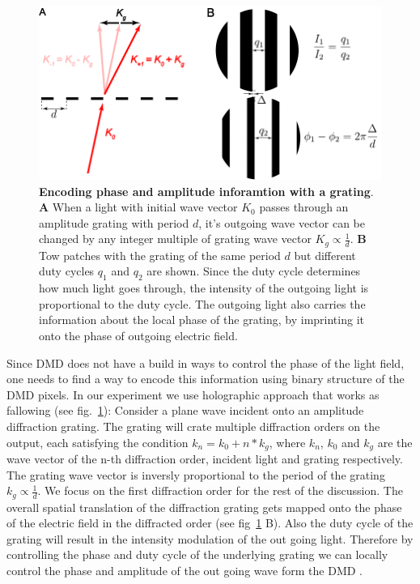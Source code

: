 \begin{figure}[t]
	\centering
	\includegraphics[scale=1]{figures/DMD_grating.pdf}
	\caption{{\bf Encoding phase and amplitude inforamtion with a grating}. {\bf A} When a light with initial wave vector $K_0$ passes through an amplitude grating with period $d$, it's outgoing wave vector can be changed by any integer multiple of grating wave vector $K_g\propto \frac{1}{d}$. {\bf B} Tow patches with the grating of the same period $d$ but different duty cycles $q_1$ and $q_2$ are shown. Since the duty cycle determines how much light goes through, the intensity of the outgoing light is proportional to the duty cycle. The outgoing light also carries the information about the local phase of the grating, by imprinting it onto the phase of outgoing electric field.}
	\label{fig:DMD_grating}
\end{figure}

Since DMD does not have a build in ways to control the phase of the light field, one needs to find a way to encode this information using binary structure of the DMD pixels. In our experiment we use holographic approach that works as fallowing (see fig.~\ref{fig:DMD_grating}): Consider a plane wave incident onto an amplitude diffraction grating. The grating will crate multiple diffraction orders on the output, each satisfying the condition $k_n = k_0 + n*k_g$, where $k_n$, $k_0$ and $k_g$ are the wave vector of the n-th diffraction order, incident light and grating respectively. The grating wave vector is inversly proportional to the period of the grating $k_g \propto \frac{1}{d}$. We focus on the first diffraction order for the rest of the discussion. The overall spatial translation of the diffraction grating gets mapped onto the phase of the electric field in the diffracted order (see fig~\ref{fig:DMD_grating} B). Also the duty cycle of the grating will result in the intensity modulation of the out going light. Therefore by controlling the phase and duty cycle of the underlying grating we can locally control the phase and amplitude of the out going wave form the DMD \cite{Zupanchich thesis}.

